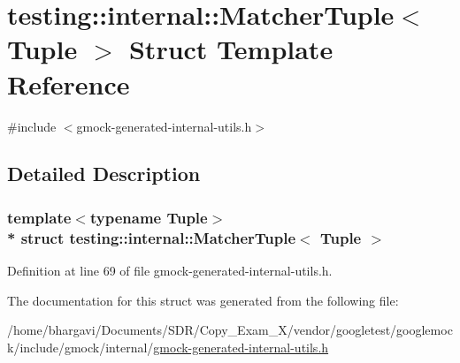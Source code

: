 \hypertarget{structtesting_1_1internal_1_1_matcher_tuple}{}\section{testing\+:\+:internal\+:\+:Matcher\+Tuple$<$ Tuple $>$ Struct Template Reference}
\label{structtesting_1_1internal_1_1_matcher_tuple}


{\ttfamily \#include $<$gmock-\/generated-\/internal-\/utils.\+h$>$}



\subsection{Detailed Description}
\subsubsection*{template$<$typename Tuple$>$\\*
struct testing\+::internal\+::\+Matcher\+Tuple$<$ Tuple $>$}



Definition at line 69 of file gmock-\/generated-\/internal-\/utils.\+h.



The documentation for this struct was generated from the following file\+:\begin{DoxyCompactItemize}
\item 
/home/bhargavi/\+Documents/\+S\+D\+R/\+Copy\+\_\+\+Exam\+\_\+X/vendor/googletest/googlemock/include/gmock/internal/\hyperlink{gmock-generated-internal-utils_8h}{gmock-\/generated-\/internal-\/utils.\+h}\end{DoxyCompactItemize}
